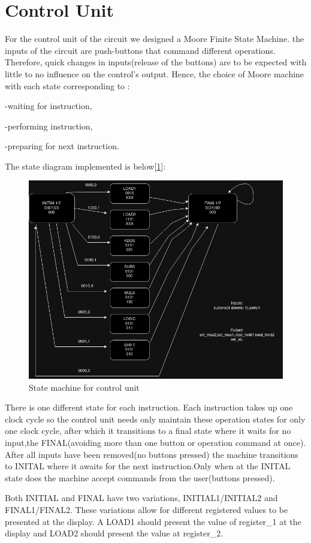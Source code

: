 \documentclass[12pt]{article}
\begin{document}

\section{Control Unit}
For the control unit of the circuit we designed a Moore Finite State Machine.
the inputs of the circuit are push-buttons that command different operations. Therefore, quick changes in inputs(release of the buttons) are to be expected with little to no influence on the control's output. Hence, the choice of Moore machine with each state corresponding to :

-waiting for instruction, 

-performing instruction,

-preparing for next instruction.

The state diagram implemented is below[\ref{fig:FSM}]:
\begin{figure}[H]
	\centering
	\includegraphics[width=0.55\linewidth]{Imagens/state_machine_lab1.jpg}
	\caption{State machine for control unit}
	\label{fig:FSM}
\end{figure}

There is one different state for each instruction. Each instruction takes up one clock cycle so the control unit needs only maintain these operation states for only one clock cycle, after which it transitions to a final state where it waits for no input,the FINAL(avoiding more than one button or operation command at once). After all inputs have been removed(no buttons pressed) the machine transitions to INITAL where it awaits for the next instruction.Only when at the INITAL state does the machine accept commands from the user(buttons pressed).

Both INITIAL and FINAL have two variations, INITIAL1/INITIAL2 and FINAL1/FINAL2. These variations allow for different registered values to be presented at the display. A LOAD1 should present the value of register\_1 at the display and LOAD2 should present the value at register\_2.
\end{document}
